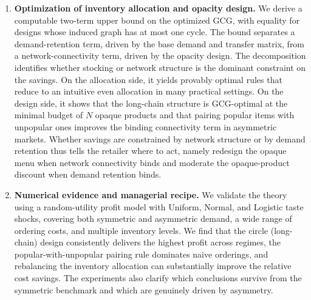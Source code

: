 \begin{enumerate}
    \item {\bf Optimization of inventory allocation and opacity design.}
    We derive a computable two-term upper bound on the optimized GCG, with equality for designs whose induced graph has at most one cycle.
    The bound separates a demand-retention term, driven by the base demand and transfer matrix, from a network-connectivity term, driven by the opacity design.
    The decomposition identifies whether stocking or network structure is the dominant constraint on the savings.
    On the allocation side, it yields provably optimal rules that reduce to an intuitive even allocation in many practical settings.
    On the design side, it shows that the long-chain structure is GCG-optimal at the minimal budget of $N$ opaque products and that pairing popular items with unpopular ones improves the binding connectivity term in asymmetric markets.
    Whether savings are constrained by network structure or by demand retention thus tells the retailer where to act, namely redesign the opaque menu when network connectivity binds and moderate the opaque-product discount when demand retention binds.

    \item {\bf Numerical evidence and managerial recipe.}
    We validate the theory using a random-utility profit model with Uniform, Normal, and Logistic taste shocks, covering both symmetric and asymmetric demand, a wide range of ordering costs, and multiple inventory levels.
    We find that the circle (long-chain) design consistently delivers the highest profit across regimes, the popular-with-unpopular pairing rule dominates naive orderings, and rebalancing the inventory allocation can substantially improve the relative cost savings.
    The experiments also clarify which conclusions survive from the symmetric benchmark and which are genuinely driven by asymmetry.
\end{enumerate}

